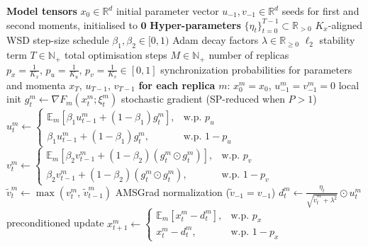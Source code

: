 \documentclass{article}
\begin{document}
\begin{algorithm}[h]
\caption{Neuron\_SP-Adam (probabilistic synchronization formulation)}
\label{alg:desloc_adam_prob}
\begin{algorithmic}[1]
\REQUIRE \textbf{Model tensors}
\STATE $x_0 \in \mathbb{R}^d$ \hfill initial parameter vector
\STATE $u_{-1}, v_{-1} \in \mathbb{R}^d$ \hfill seeds for first and second moments, initialised to $\mathbf{0}$
\REQUIRE \textbf{Hyper-parameters}
\STATE $\{\eta_t\}_{t=0}^{T-1} \subset \mathbb{R}_{>0}$ \hfill $K_x$-aligned WSD step-size schedule
\STATE $\beta_1, \beta_2 \in [0,1)$ \hfill Adam decay factors
\STATE $\lambda \in \mathbb{R}_{\geq 0}$ \hfill $\ell_2$ stability term
\STATE $T \in \mathbb{N}_+$ \hfill total optimisation steps
\STATE $M \in \mathbb{N}_+$ \hfill number of replicas
\STATE $p_x = \frac{1}{K_x},\, p_u = \frac{1}{K_u},\, p_v = \frac{1}{K_v} \in [0,1]$ \hfill synchronization probabilities for parameters and momenta
\ENSURE $x_T$, $u_{T-1}$, $v_{T-1}$
\STATE \textbf{for each replica} $m$: $x_0^m = x_0$, $u_{-1}^m = v_{-1}^m = 0$ \hfill local init
\STATE $g_t^m \leftarrow \nabla F_m(x_t^m; \xi_t^m)$ \hfill stochastic gradient (SP-reduced when $P > 1$)
\STATE $u_t^m \leftarrow \begin{cases} \mathbb{E}_m[\beta_1 u_{t-1}^m + (1-\beta_1) g_t^m], & \text{w.p.\ } p_u \\ \beta_1 u_{t-1}^m + (1-\beta_1) g_t^m, & \text{w.p.\ } 1 - p_u \end{cases}$
\STATE $v_t^m \leftarrow \begin{cases} \mathbb{E}_m[\beta_2 v_{t-1}^m + (1-\beta_2)(g_t^m \odot g_t^m)], & \text{w.p.\ } p_v \\ \beta_2 v_{t-1}^m + (1-\beta_2)(g_t^m \odot g_t^m), & \text{w.p.\ } 1 - p_v \end{cases}$
\STATE $\tilde{v}_t^m \leftarrow \max(v_t^m,\, \tilde{v}_{t-1}^m)$ \hfill AMSGrad normalization ($\tilde{v}_{-1} = v_{-1}$)
\STATE $d_t^m \leftarrow \frac{\eta_t}{\sqrt{\tilde{v}_t^m + \lambda^2}} \odot u_t^m$ \hfill preconditioned update
\STATE $x_{t+1}^m \leftarrow \begin{cases} \mathbb{E}_m[x_t^m - d_t^m], & \text{w.p.\ } p_x \\ x_t^m - d_t^m, & \text{w.p.\ } 1 - p_x \end{cases}$
\ENDFOR
\ENDFOR
\end{algorithmic}
\end{algorithm}
\end{document}
